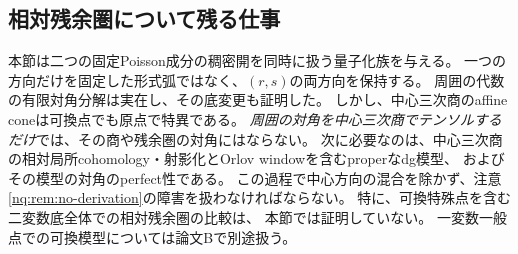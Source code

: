 \subsection{相対残余圏について残る仕事}
本節は二つの固定Poisson成分の稠密開を同時に扱う量子化族を与える。
一つの方向だけを固定した形式弧ではなく、$(r,s)$の両方向を保持する。
周囲の代数の有限対角分解は実在し、その底変更も証明した。
しかし、中心三次商のaffine coneは可換点でも原点で特異である。
\emph{周囲の対角を中心三次商でテンソルするだけ}では、その商や残余圏の対角にはならない。
次に必要なのは、中心三次商の相対局所cohomology・射影化とOrlov windowを含むproperなdg模型、
およびその模型の対角のperfect性である。
この過程で中心方向の混合を除かず、注意\ref{nq:rem:no-derivation}の障害を扱わなければならない。
特に、可換特殊点を含む二変数底全体での相対残余圏の比較は、
本節では証明していない。
一変数一般点での可換模型については論文Bで別途扱う。
